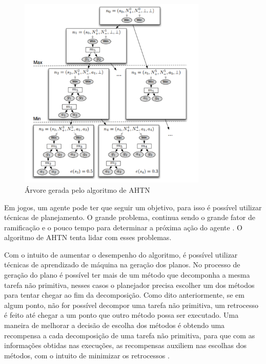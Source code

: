\begin{figure}[ht]
	\centering
	\includegraphics[width=0.8\textwidth]{fig/ahtn.pdf} 
	\caption{Árvore gerada pelo algoritmo de AHTN}
	\label{fig:ahtn}
\end{figure}

Em jogos, um agente pode ter que seguir um objetivo, para isso é possível utilizar técnicas de planejamento. 
O grande problema, continua sendo o grande fator de ramificação e o pouco tempo para determinar a próxima ação do agente \cite{}.  
O algoritmo de AHTN tenta lidar com esses problemas. 

Com o intuito de aumentar o desempenho do algoritmo, é possível utilizar técnicas de aprendizado de máquina na geração dos planos.  
No processo de geração do plano é possível ter mais de um método que decomponha a mesma tarefa não primitiva, nesses casos o planejador precisa escolher um dos métodos para tentar chegar ao fim da decomposição. 
Como dito anteriormente, se em algum ponto, não for possível decompor uma tarefa não primitiva, um retrocesso é feito até chegar a um ponto que outro método possa ser executado.  
Uma maneira de melhorar a decisão de escolha dos métodos é obtendo uma recompensa a cada decomposição de uma tarefa não primitiva, para que com as informações obtidas nas execuções, as recompensas auxiliem nas escolhas dos métodos, com o intuito de minimizar os retrocessos \cite{hogg2010learning}. 

